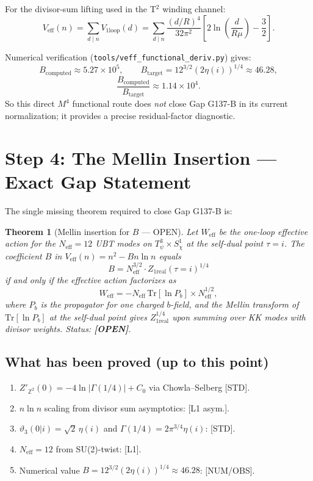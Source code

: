 \documentclass[12pt,a4paper]{article}
\newtheorem{theorem}{Theorem}[section]
\begin{document}
For the divisor-sum lifting used in the T$^2$ winding channel:
\[
V_{\mathrm{eff}}(n)=\sum_{d\mid n}V_{1\mathrm{loop}}(d)
=\sum_{d\mid n}\frac{(d/R)^4}{32\pi^2}
\left[2\ln\!\left(\frac{d}{R\mu}\right)-\frac32\right].
\]

Numerical verification (\texttt{tools/veff\_functional\_deriv.py}) gives:
\[
B_{\mathrm{computed}}\approx 5.27\times 10^5,\qquad
B_{\mathrm{target}}=12^{3/2}(2\eta(i))^{1/4}\approx 46.28,
\]
\[
\frac{B_{\mathrm{computed}}}{B_{\mathrm{target}}}\approx 1.14\times 10^4.
\]
So this direct $M^4$ functional route does \emph{not} close Gap G137-B in its
current normalization; it provides a precise residual-factor diagnostic.

\section{Step 4: The Mellin Insertion — Exact Gap Statement}
\label{sec:mellin}

The single missing theorem required to close Gap G137-B is:

\begin{theorem}[Mellin insertion for $B$ — OPEN]
\label{thm:mellin}
Let $W_{\mathrm{eff}}$ be the one-loop effective action for the $N_{\mathrm{eff}} = 12$
UBT modes on $T^3_\psi\times S^1_\chi$ at the self-dual point $\tau = i$.
The coefficient $B$ in $V_{\mathrm{eff}}(n) = n^2 - Bn\ln n$ equals
\[
B = N_{\mathrm{eff}}^{3/2}\cdot Z_{1\mathrm{real}}(\tau=i)^{1/4}
\]
if and only if the effective action factorizes as
\begin{equation}
W_{\mathrm{eff}} = -N_{\mathrm{eff}}\,\mathrm{Tr}[\ln P_b]
\times N_{\mathrm{eff}}^{1/2},
\label{eq:weff_factor}
\end{equation}
where $P_b$ is the propagator for one charged $b$-field, and the
Mellin transform of $\mathrm{Tr}[\ln P_b]$ at the self-dual point gives
$Z_{1\mathrm{real}}^{1/4}$ upon summing over KK modes with divisor weights.
Status: \textbf{[OPEN]}.
\end{theorem}

\subsection*{What has been proved (up to this point)}

\begin{enumerate}
\item $Z'_{\mathbb{Z}^2}(0) = -4\ln|\Gamma(1/4)| + C_0$ via Chowla--Selberg [STD].
\item $n\ln n$ scaling from divisor sum asymptotics: [L1 asym.].
\item $\vartheta_3(0|i) = \sqrt{2}\,\eta(i)$ and $\Gamma(1/4) = 2\pi^{3/4}\eta(i)$: [STD].
\item $N_{\mathrm{eff}} = 12$ from SU(2)-twist: [L1].
\item Numerical value $B = 12^{3/2}(2\eta(i))^{1/4} \approx 46.28$: [NUM/OBS].
\end{enumerate}
\end{document}
